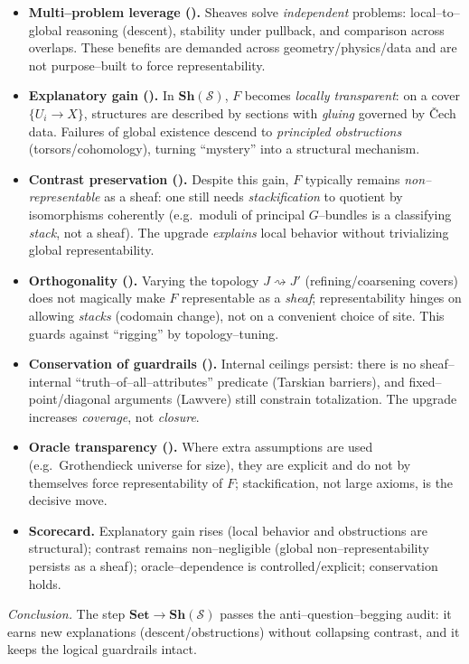\documentclass[11pt]{article}
\theoremstyle{upright}
\begin{document}
\begin{itemize}[leftmargin=2em]
\item \textbf{Multi–problem leverage \;(\checkmark).}
Sheaves solve \emph{independent} problems: local–to–global reasoning (descent), stability under pullback, and comparison across overlaps. These benefits are demanded across geometry/physics/data and are not purpose–built to force representability.

\item \textbf{Explanatory gain \;(\checkmark).}
In $\mathbf{Sh}(\mathcal S)$, $F$ becomes \emph{locally transparent}: on a cover $\{U_i\!\to\!X\}$, structures are described by sections with \emph{gluing} governed by Čech data. Failures of global existence descend to \emph{principled obstructions} (torsors/cohomology), turning “mystery” into a structural mechanism.

\item \textbf{Contrast preservation \;(\checkmark).}
Despite this gain, $F$ typically remains \emph{non–representable} as a sheaf: one still needs \emph{stackification} to quotient by isomorphisms coherently (e.g.\ moduli of principal $G$–bundles is a classifying \emph{stack}, not a sheaf). The upgrade \emph{explains} local behavior without trivializing global representability.

\item \textbf{Orthogonality \;(\checkmark).}
Varying the topology $J\rightsquigarrow J'$ (refining/coarsening covers) does not magically make $F$ representable as a \emph{sheaf}; representability hinges on allowing \emph{stacks} (codomain change), not on a convenient choice of site. This guards against “rigging” by topology–tuning.

\item \textbf{Conservation of guardrails \;(\checkmark).}
Internal ceilings persist: there is no sheaf–internal “truth–of–all–attributes” predicate (Tarskian barriers), and fixed–point/diagonal arguments (Lawvere) still constrain totalization. The upgrade increases \emph{coverage}, not \emph{closure}.

\item \textbf{Oracle transparency \;(\checkmark).}
Where extra assumptions are used (e.g.\ Grothendieck universe for size), they are explicit and do not by themselves force representability of $F$; stackification, not large axioms, is the decisive move.

\item \textbf{Scorecard.}
Explanatory gain rises (local behavior and obstructions are structural); contrast remains non–negligible (global non–representability persists as a sheaf); oracle–dependence is controlled/explicit; conservation holds.
\end{itemize}
\noindent\emph{Conclusion.} The step $\mathbf{Set}\!\to\!\mathbf{Sh}(\mathcal S)$ passes the anti–question–begging audit: it earns new explanations (descent/obstructions) without collapsing contrast, and it keeps the logical guardrails intact.
\end{document}
